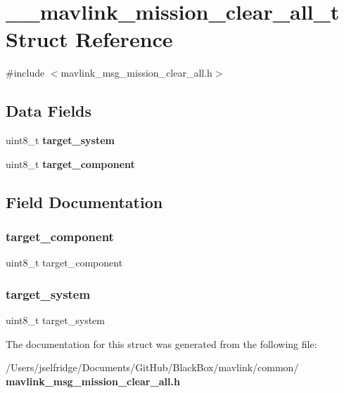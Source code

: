 \section{\+\_\+\+\_\+mavlink\+\_\+mission\+\_\+clear\+\_\+all\+\_\+t Struct Reference}
\label{struct____mavlink__mission__clear__all__t}


{\ttfamily \#include $<$mavlink\+\_\+msg\+\_\+mission\+\_\+clear\+\_\+all.\+h$>$}

\subsection*{Data Fields}
\begin{DoxyCompactItemize}
\item 
uint8\+\_\+t \textbf{ target\+\_\+system}
\item 
uint8\+\_\+t \textbf{ target\+\_\+component}
\end{DoxyCompactItemize}


\subsection{Field Documentation}
\mbox{\label{struct____mavlink__mission__clear__all__t_a1763123cfc5fa7f9c51ec44947d5790f}} 
\subsubsection{target\+\_\+component}
{\footnotesize\ttfamily uint8\+\_\+t target\+\_\+component}

\mbox{\label{struct____mavlink__mission__clear__all__t_ac9afff43526a157e4c4e45607c1418b8}} 
\subsubsection{target\+\_\+system}
{\footnotesize\ttfamily uint8\+\_\+t target\+\_\+system}



The documentation for this struct was generated from the following file\+:\begin{DoxyCompactItemize}
\item 
/\+Users/jselfridge/\+Documents/\+Git\+Hub/\+Black\+Box/mavlink/common/\textbf{ mavlink\+\_\+msg\+\_\+mission\+\_\+clear\+\_\+all.\+h}\end{DoxyCompactItemize}
